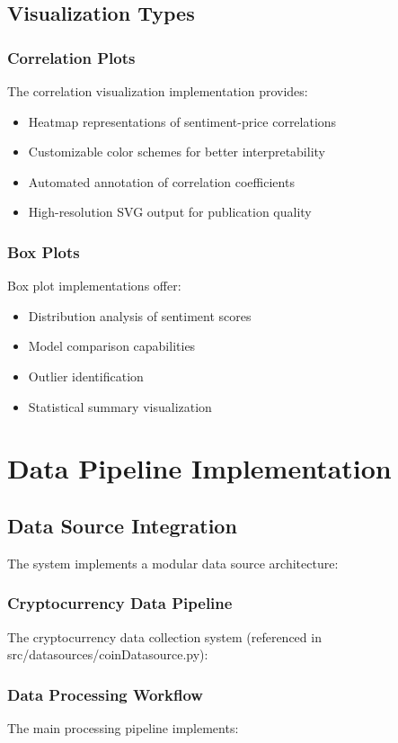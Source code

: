 \documentclass[12pt,a4paper]{report}
\begin{document}
\section{Visualization Types}
\subsection{Correlation Plots}
The correlation visualization implementation provides:
\begin{itemize}
    \item Heatmap representations of sentiment-price correlations
    \item Customizable color schemes for better interpretability
    \item Automated annotation of correlation coefficients
    \item High-resolution SVG output for publication quality
\end{itemize}

\subsection{Box Plots}
Box plot implementations offer:
\begin{itemize}
    \item Distribution analysis of sentiment scores
    \item Model comparison capabilities
    \item Outlier identification
    \item Statistical summary visualization
\end{itemize}

\chapter{Data Pipeline Implementation}
\section{Data Source Integration}
The system implements a modular data source architecture:

\subsection{Cryptocurrency Data Pipeline}
The cryptocurrency data collection system (referenced in src/datasources/coinDatasource.py):

\subsection{Data Processing Workflow}
The main processing pipeline implements:
\end{document}
